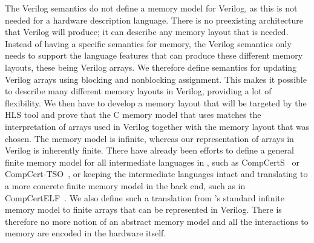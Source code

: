 The Verilog semantics do not define a memory model for Verilog, as this is not
needed for a hardware description language.  There is no preexisting
architecture that Verilog will produce; it can describe any memory layout that
is needed.  Instead of having a specific semantics for memory, the Verilog
semantics only needs to support the language features that can produce these
different memory layouts, these being Verilog arrays.  We therefore define
semantics for updating Verilog arrays using blocking and nonblocking assignment.
This makes it possible to describe many different memory layouts in Verilog,
providing a lot of flexibility.  We then have to develop a memory layout that
will be targeted by the \gls{HLS} tool and prove that the C memory model that
\compcert{} uses matches the interpretation of arrays used in Verilog together
with the memory layout that was chosen.  The \compcert{} memory model is
infinite, whereas our representation of arrays in Verilog is inherently finite.
There have already been efforts to define a general finite memory model for all
intermediate languages in \compcert{}, such as CompCertS~\cite{besson18_compc}
or CompCert-TSO~\cite{sevcik13_compc}, or keeping the intermediate languages
intact and translating to a more concrete finite memory model in the back end,
such as in Comp\-Cert\-ELF~\cite{wang20_compc}.  We also define such a
translation from \compcert{}'s standard infinite memory model to finite arrays
that can be represented in Verilog.  There is therefore no more notion of an
abstract memory model and all the interactions to memory are encoded in the
hardware itself.

